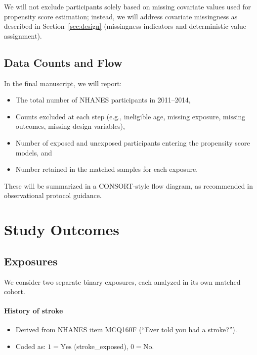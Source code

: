 \documentclass{article}
\begin{document}
We will not exclude participants solely based on missing covariate values used for propensity score estimation; instead, we will address covariate missingness as described in Section~\ref{sec:design} (missingness indicators and deterministic value assignment).

\subsection{Data Counts and Flow}

In the final manuscript, we will report:

\begin{itemize}
    \item The total number of NHANES participants in 2011--2014,

    \item Counts excluded at each step (e.g., ineligible age, missing exposure, missing outcomes, missing design variables),

    \item Number of exposed and unexposed participants entering the propensity score models, and

    \item Number retained in the matched samples for each exposure.

\end{itemize}

These will be summarized in a CONSORT-style flow diagram, as recommended in observational protocol guidance.

\section{Study Outcomes}

\subsection{Exposures}

We consider two separate binary exposures, each analyzed in its own matched cohort.

\paragraph{History of stroke}

\begin{itemize}
    \item Derived from NHANES item MCQ160F (``Ever told you had a stroke?'').

    \item Coded as: $1 = \text{Yes}$ (stroke\_exposed), $0 = \text{No}$.

\end{itemize}
\end{document}
